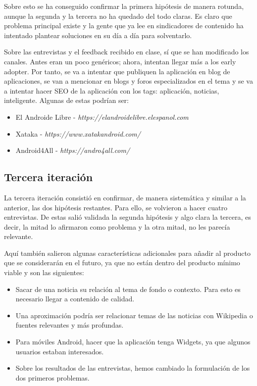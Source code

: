 Sobre esto se ha conseguido confirmar la primera hipótesis de manera rotunda, aunque la segunda y la tercera no ha quedado del todo claras. Es claro que problema principal existe y la gente que ya lee en sindicadores de contenido ha intentado plantear soluciones en su día a día para solventarlo.

Sobre las entrevistas y el feedback recibido en clase, sí que se han modificado los canales. Antes eran un poco genéricos; ahora, intentan llegar más a los early adopter. Por tanto, se va a intentar que publiquen la aplicación en blog de aplicaciones, se van a mencionar en blogs y foros especializados en el tema y se va a intentar hacer SEO de la aplicación con los tags: aplicación, noticias, inteligente. Algunas de estas podrían ser:

\begin{itemize}
    \item El Androide Libre - \textsl{https://elandroidelibre.elespanol.com}
    \item Xataka - \textsl{https://www.xatakandroid.com/}
    \item Android4All - \textsl{https://andro4all.com/}
\end{itemize}


\subsection{Tercera iteración}

La tercera iteración consistió en confirmar, de manera sistemática y similar a la anterior, las dos hipótesis restantes. Para ello, se volvieron a hacer cuatro entrevistas. De estas salió validada la segunda hipótesis y algo clara la tercera, es decir, la mitad lo afirmaron como problema y la otra mitad, no les parecía relevante.

Aquí también salieron algunas características adicionales para añadir al producto que se considerarán en el futuro, ya que no están dentro del producto mínimo viable y son las siguientes:

\begin{itemize}
    \item Sacar de una noticia su relación al tema de fondo o contexto. Para esto es necesario llegar a contenido de calidad.
    \item Una aproximación podría ser relacionar temas de las noticias con Wikipedia o fuentes relevantes y más profundas.
    \item Para móviles Android, hacer que la aplicación tenga Widgets, ya que algunos usuarios estaban interesados.
    \item Sobre los resultados de las entrevistas, hemos cambiado la formulación de los dos primeros problemas.
\end{itemize}

